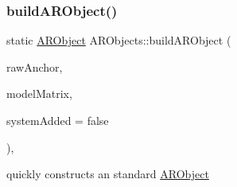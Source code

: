 \subsubsection{\texorpdfstring{build\+A\+R\+Object()}{buildARObject()}}
{\footnotesize\ttfamily static \hyperlink{struct_a_r_objects_1_1_a_r_object}{A\+R\+Object} A\+R\+Objects\+::build\+A\+R\+Object (\begin{DoxyParamCaption}\item[{A\+R\+Anchor $\ast$}]{raw\+Anchor,  }\item[{of\+Matrix4x4}]{model\+Matrix,  }\item[{bool}]{system\+Added = {\ttfamily false} }\end{DoxyParamCaption})\hspace{0.3cm}{\ttfamily [inline]}, {\ttfamily [static]}}



quickly constructs an standard \hyperlink{struct_a_r_objects_1_1_a_r_object}{A\+R\+Object} 

